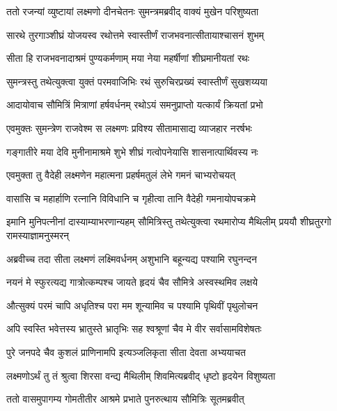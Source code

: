\twolineshloka
{ततो रजन्यां व्युष्टायां लक्ष्मणो दीनचेतनः}
{सुमन्त्रमब्रवीद् वाक्यं मुखेन परिशुष्यता} %

\twolineshloka
{सारथे तुरगाञ्शीघ्रं योजयस्व रथोत्तमे}
{स्वास्तीर्णं राजभवनात्सीतायाश्चासनं शुभम्} %

\twolineshloka
{सीता हि राजभवनादाश्रमं पुण्यकर्मणाम्}
{मया नेया महर्षीणां शीघ्रमानीयतां रथः} %

\twolineshloka
{सुमन्त्रस्तु तथेत्युक्त्वा युक्तं परमवाजिभिः}
{रथं सुरुचिरप्रख्यं स्वास्तीर्णं सुखशय्यया} %

\twolineshloka
{आदायोवाच सौमित्रिं मित्राणां हर्षवर्धनम्}
{रथोऽयं समनुप्राप्तो यत्कार्यं क्रियतां प्रभो} %

\twolineshloka
{एवमुक्तः सुमन्त्रेण राजवेश्म स लक्ष्मणः}
{प्रविश्य सीतामासाद्य व्याजहार नरर्षभः} %

\twolineshloka
{गङ्गातीरे मया देवि मुनीनामाश्रमे शुभे}
{शीघ्रं गत्वोपनेयासि शासनात्पार्थिवस्य नः} %

\twolineshloka
{एवमुक्ता तु वैदेही लक्ष्मणेन महात्मना}
{प्रहर्षमतुलं लेभे गमनं चाभ्यरोचयत्} %

\twolineshloka
{वासांसि च महार्हाणि रत्नानि विविधानि च}
{गृहीत्वा तानि वैदेही गमनायोपचक्रमे} %

\threelineshloka
{इमानि मुनिपत्नीनां दास्याम्याभरणान्यहम्}
{सौमित्रिस्तु तथेत्युक्त्वा रथमारोप्य मैथिलीम्}
{प्रययौ शीघ्रतुरगो रामस्याज्ञामनुस्मरन्} %

\twolineshloka
{अब्रवीच्च तदा सीता लक्ष्मणं लक्ष्मिवर्धनम्}
{अशुभानि बहून्यद्य पश्यामि रघुनन्दन} %

\twolineshloka
{नयनं मे स्फुरत्यद्य गात्रोत्कम्पश्च जायते}
{हृदयं चैव सौमित्रे अस्वस्थमिव लक्षये} %

\twolineshloka
{औत्सुक्यं परमं चापि अधृतिश्च परा मम}
{शून्यामिव च पश्यामि पृथिवीं पृथुलोचन} %

\twolineshloka
{अपि स्वस्ति भवेत्तस्य भ्रातुस्ते भ्रातृभिः सह}
{श्वश्रूणां चैव मे वीर सर्वासामविशेषतः} %

\twolineshloka
{पुरे जनपदे चैव कुशलं प्राणिनामपि}
{इत्यञ्जलिकृता सीता देवता अभ्ययाचत} %

\twolineshloka
{लक्ष्मणोऽर्थं तु तं श्रुत्वा शिरसा वन्द्य मैथिलीम्}
{शिवमित्यब्रवीद् धृष्टो हृदयेन विशुष्यता} %

\twolineshloka
{ततो वासमुपागम्य गोमतीतीर आश्रमे}
{प्रभाते पुनरुत्थाय सौमित्रिः सूतमब्रवीत्} %

